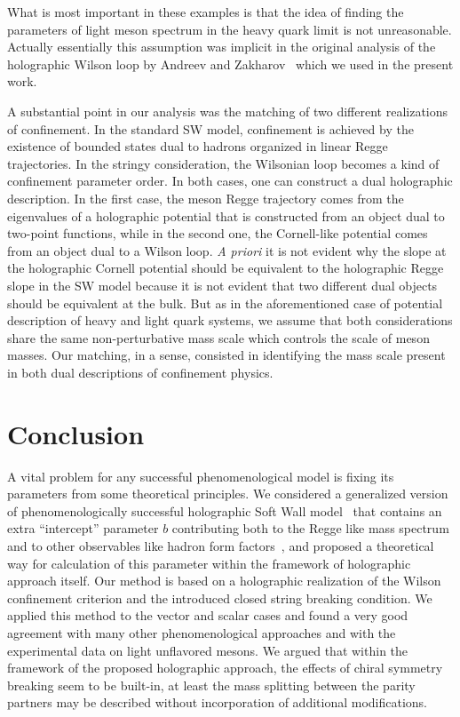 \documentclass[a4paper,11pt]{article}
\begin{document}
What is most important in these examples is that the idea of finding the parameters of light meson spectrum in the heavy
quark limit is not unreasonable. Actually essentially this assumption was implicit in the original analysis of the holographic
Wilson loop by Andreev and Zakharov~\cite{Andreev:2006ct} which we used in the present work.

A substantial point in our analysis was the matching of two different realizations of confinement. In the standard SW model,
confinement is achieved by the existence of bounded states dual to hadrons organized in linear Regge trajectories.
In the stringy consideration, the Wilsonian loop becomes a kind of confinement parameter order. In both cases, one can construct
a dual holographic description. In the first case, the meson Regge trajectory comes from the eigenvalues of a holographic potential
that is constructed from an object dual to two-point functions, while in the second one, the Cornell-like potential comes from an object
dual to a Wilson loop. {\it A priori} it is not evident why the slope at the holographic Cornell potential should be equivalent to the
holographic Regge slope in the SW model because it is not evident that two different dual objects should be equivalent at the bulk.
But as in the aforementioned case of potential description of heavy and light quark systems, we assume that both considerations
share the same non-perturbative mass scale which controls the scale of meson masses. Our matching, in a sense, consisted in identifying
the mass scale present in both dual descriptions of confinement physics.




\section{Conclusion}

A vital problem for any successful phenomenological model is fixing its parameters from some
theoretical principles. We considered a generalized version of phenomenologically successful
holographic Soft Wall model~\cite{son2} that contains an extra ``intercept'' parameter $b$ contributing
both to the Regge like mass spectrum and to other observables like hadron form factors~\cite{Afonin:2021cwo},
and proposed a theoretical way for calculation of this parameter within the framework of holographic
approach itself. Our method is based on a holographic realization of the Wilson confinement criterion
and the introduced closed string breaking condition.
We applied this method to the vector and scalar cases and found a very good agreement with many other
phenomenological approaches and with the experimental data on light unflavored mesons. We argued that
within the framework of the proposed holographic approach, the effects of chiral symmetry breaking seem
to be built-in, at least the mass splitting between the parity partners may be described without
incorporation of additional modifications.
\end{document}
